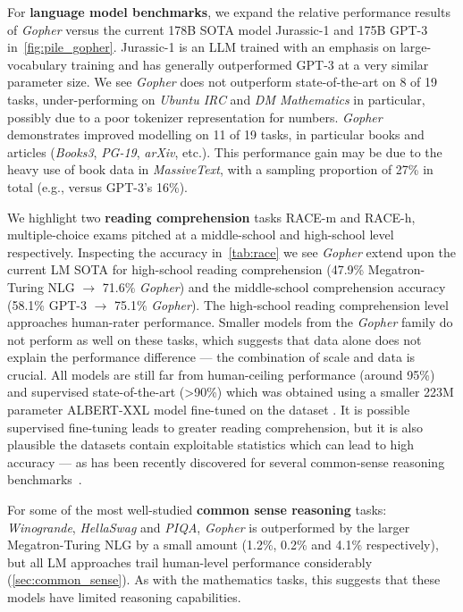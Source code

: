 For \textbf{language model benchmarks}, we expand the relative performance results of \textit{Gopher} versus the current 178B SOTA model Jurassic-1 and 175B GPT-3 in~\autoref{fig:pile_gopher}. Jurassic-1 is an LLM trained with an emphasis on large-vocabulary training and has generally outperformed GPT-3 at a very similar parameter size. We see \textit{Gopher} does not outperform state-of-the-art on 8 of 19 tasks, under-performing on \textit{Ubuntu IRC} and \textit{DM Mathematics} in particular, possibly due to a poor tokenizer representation for numbers. \textit{Gopher} demonstrates improved modelling on 11 of 19 tasks, in particular books and articles (\textit{Books3}, \textit{PG-19}, \textit{arXiv}, etc.). This performance gain may be due to the heavy use of book data in \textit{MassiveText}, with a sampling proportion of 27\% in total (e.g., versus GPT-3's 16\%). 

We highlight two \textbf{reading comprehension} tasks RACE-m and RACE-h, multiple-choice exams pitched at a middle-school and high-school level respectively. Inspecting the accuracy in~\autoref{tab:race} we see \textit{Gopher} extend upon the current LM SOTA for high-school reading comprehension (47.9\% Megatron-Turing NLG $\rightarrow$ 71.6\% \textit{Gopher}) and the middle-school comprehension accuracy (58.1\% GPT-3 $\rightarrow$ 75.1\% \textit{Gopher}). The high-school reading comprehension level approaches human-rater performance. Smaller models from the \textit{Gopher} family do not perform as well on these tasks, which suggests that data alone does not explain the performance difference --- the combination of scale and data is crucial. All models are still far from human-ceiling performance (around 95\%) and supervised state-of-the-art (>90\%) which was obtained using a smaller 223M parameter ALBERT-XXL model fine-tuned on the dataset \citep{race-sota}. It is possible supervised fine-tuning leads to greater reading comprehension, but it is also plausible the datasets contain exploitable statistics which can lead to high accuracy --- as has been recently discovered for several common-sense reasoning benchmarks~\citep{li2021systematic}.

For some of the most well-studied \textbf{common sense reasoning} tasks: \textit{Winogrande}, \textit{HellaSwag} and \textit{PIQA}, \textit{Gopher} is outperformed by the larger Megatron-Turing NLG by a small amount (1.2\%, 0.2\% and 4.1\% respectively), but all LM approaches trail human-level performance considerably (\autoref{sec:common_sense}).  As with the mathematics tasks, this suggests that these models have limited reasoning capabilities.

